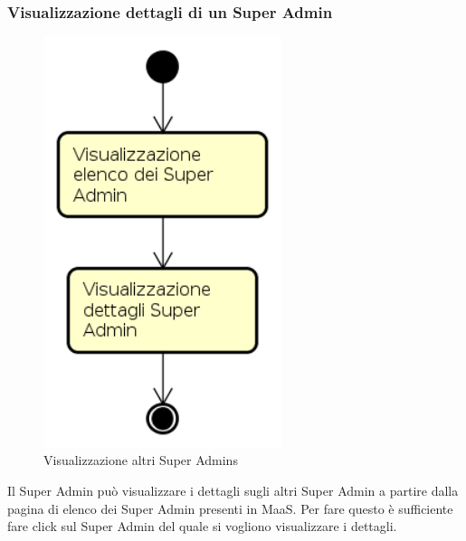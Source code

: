 \subsubsection{Visualizzazione dettagli di un Super Admin}
\begin{figure}[H]
\begin{center}
\includegraphics[height=12cm]{res/sections/backend/activities/visualizzazioneDettagliSuperAdminSA.png}
\caption{Visualizzazione altri Super Admins}
\end{center}
\end{figure}
Il Super Admin può visualizzare i dettagli sugli altri Super Admin a partire dalla pagina di elenco dei Super Admin presenti in MaaS. Per fare questo è sufficiente fare click sul Super Admin del quale si vogliono visualizzare i dettagli.
